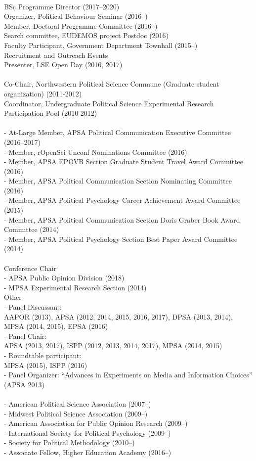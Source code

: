 \documentclass[12pt]{article}
\newcommand{\topic}[1]{\pagebreak[3]\indent {\color{lg}{\footnotesize #1 }}\\}
\newcommand{\entry}[1]{\indent {\color{lg}\guillemotright}\hspace{2pt}#1\vspace{.25em}\\}
\newcommand{\subentry}[1]{{\color{lg}-} #1\vspace{.25em}\\}
\begin{document}
\topic{Departmental (London School of Economics and Political Science)}
	\entry{BSc Programme Director (2017--2020)}
    \entry{Organizer, Political Behaviour Seminar (2016--)}
	\entry{Member, Doctoral Programme Committee (2016--)}
    \entry{Search committee, EUDEMOS project Postdoc (2016)}
	\entry{Faculty Participant, Government Department Townhall (2015--)}
    \entry{Recruitment and Outreach Events}
        \entry{Presenter, LSE Open Day (2016, 2017)}

\topic{Departmental (Northwestern University)}
	\entry{Co-Chair, Northwestern Political Science Commune (Graduate student organization) (2011-2012)}
	\entry{Coordinator, Undergraduate Political Science Experimental Research Participation Pool (2010-2012)}

\topic{Disciplinary Committees}
		\subentry{At-Large Member, APSA Political Communication Executive Committee (2016--2017)}
		\subentry{Member, rOpenSci Unconf Nominations Committee (2016)}
		\subentry{Member, APSA EPOVB Section Graduate Student Travel Award Committee (2016)}
		\subentry{Member, APSA Political Communication Section Nominating Committee (2016)}
		\subentry{Member, APSA Political Psychology Career Achievement Award Committee (2015)}
		\subentry{Member, APSA Political Communication Section Doris Graber Book Award Committee (2014)}
		\subentry{Member, APSA Political Psychology Section Best Paper Award Committee (2014)}

\topic{Service at Professional Conferences}
    \entry{Conference Chair}
        \subentry{APSA Public Opinion Division (2018)}
        \subentry{MPSA Experimental Research Section (2014)}
	\entry{Other}
        \subentry{Panel Discussant:\\ AAPOR (2013), APSA (2012, 2014, 2015, 2016, 2017), DPSA (2013, 2014), MPSA (2014, 2015), EPSA (2016)}
		\subentry{Panel Chair:\\ APSA (2013, 2017), ISPP (2012, 2013, 2014, 2017), MPSA (2014, 2015)}
		\subentry{Roundtable participant:\\ MPSA (2015), ISPP (2016)}
		\subentry{Panel Organizer: ``Advances in Experiments on Media and Information Choices'' (APSA 2013)}

\topic{Professional Memberships:}
		\subentry{American Political Science Association (2007--)}
		\subentry{Midwest Political Science Association (2009--)}
		\subentry{American Association for Public Opinion Research (2009--)}
		\subentry{International Society for Political Psychology (2009--)}
		\subentry{Society for Political Methodology (2010--)}
		\subentry{Associate Fellow, Higher Education Academy (2016--)}
\end{document}
